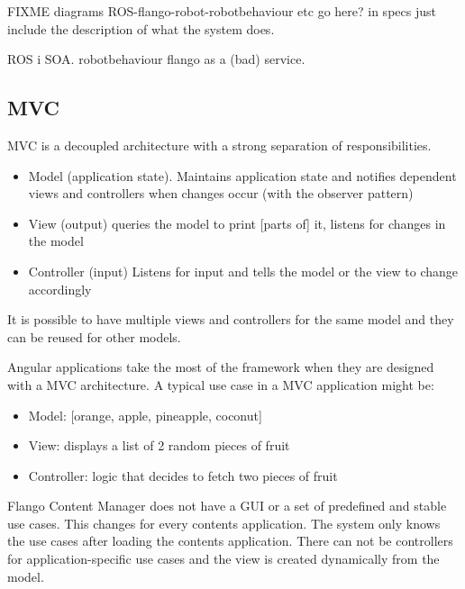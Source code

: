 FIXME diagrams ROS-flango-robot-robotbehaviour etc go here? in specs  just include the description of what the system does.

ROS i SOA.
robotbehaviour
flango as a (bad) service.



\subsection{MVC}
\ac{MVC} is a decoupled architecture with a strong separation of responsibilities.
\begin{itemize}
    \item Model (application state). Maintains application state and notifies dependent views and controllers when changes occur (with the observer pattern)
    \item View (output) queries the model to print [parts of] it, listens for changes in the model
    \item Controller (input) Listens for input and tells the model or the view to change accordingly
\end{itemize}

It is possible to have multiple views and controllers for the same model and they can be reused for other models.

Angular applications take the most of the framework when they are designed with a \ac{MVC} architecture.
A typical use case in a \ac{MVC} application might be:
\begin{itemize}
    \item Model: [orange, apple, pineapple, coconut]
    \item View: displays a list of 2 random pieces of fruit
    \item Controller: logic that decides to fetch two pieces of fruit
\end{itemize}

Flango Content Manager does not have a \ac{GUI} or a set of predefined and stable use cases.
This changes for every contents application.
The system only knows the use cases after loading the contents application.
There can not be controllers for application-specific use cases and the view is created dynamically from the model.

